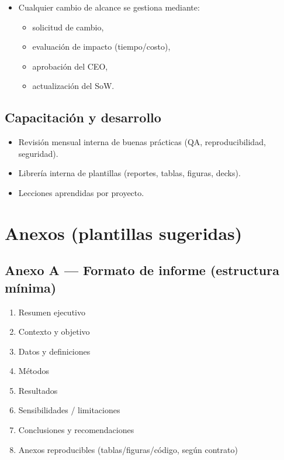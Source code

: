 \documentclass[
  spanish,
]{article}
\begin{document}
\begin{itemize}
\tightlist
\item
  Cualquier cambio de alcance se gestiona mediante:

  \begin{itemize}
  \tightlist
  \item
    solicitud de cambio,
  \item
    evaluación de impacto (tiempo/costo),
  \item
    aprobación del CEO,
  \item
    actualización del SoW.
  \end{itemize}
\end{itemize}

\subsection{Capacitación y
desarrollo}\label{capacitaciuxf3n-y-desarrollo}

\begin{itemize}
\tightlist
\item
  Revisión mensual interna de buenas prácticas (QA, reproducibilidad,
  seguridad).
\item
  Librería interna de plantillas (reportes, tablas, figuras, decks).
\item
  Lecciones aprendidas por proyecto.
\end{itemize}

\section{Anexos (plantillas
sugeridas)}\label{anexos-plantillas-sugeridas}

\subsection{Anexo A --- Formato de informe (estructura
mínima)}\label{anexo-a-formato-de-informe-estructura-muxednima}

\begin{enumerate}
\def\labelenumi{\arabic{enumi}.}
\tightlist
\item
  Resumen ejecutivo\\
\item
  Contexto y objetivo\\
\item
  Datos y definiciones\\
\item
  Métodos\\
\item
  Resultados\\
\item
  Sensibilidades / limitaciones\\
\item
  Conclusiones y recomendaciones\\
\item
  Anexos reproducibles (tablas/figuras/código, según contrato)
\end{enumerate}
\end{document}
